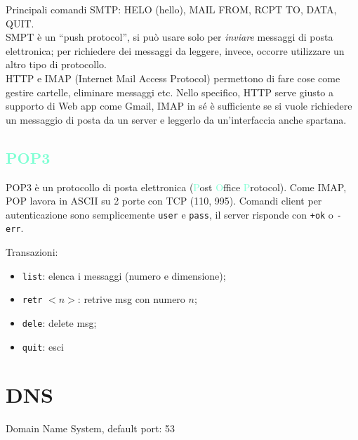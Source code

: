 \noindent Principali comandi SMTP: HELO (hello), MAIL FROM, RCPT TO, DATA, QUIT. \\

\noindent SMPT è un ``push protocol'', si può usare solo per \textit{inviare} messaggi di posta elettronica; per richiedere dei messaggi da leggere, invece, occorre utilizzare un altro tipo di protocollo.\\

\noindent HTTP e IMAP (Internet Mail Access Protocol) permettono di fare cose come gestire cartelle, eliminare messaggi etc. Nello specifico, HTTP serve giusto a supporto di Web app come Gmail, IMAP in sé è sufficiente se si vuole richiedere un messaggio di posta da un server e leggerlo da un'interfaccia anche spartana.

\subsection*{\textcolor{Aquamarine}{POP3}}
\noindent POP3 è un protocollo di posta elettronica (\textcolor{Aquamarine}{P}ost \textcolor{Aquamarine}{O}ffice \textcolor{Aquamarine}{P}rotocol). Come IMAP, POP lavora in ASCII su 2 porte con TCP (110, 995). Comandi client per autenticazione sono semplicemente \texttt{user} e \texttt{pass}, il server risponde con \texttt{+ok} o \texttt{-err}.

\noindent Transazioni:
\begin{itemize}
    \item \texttt{list}: elenca i messaggi (numero e dimensione);
    \item \texttt{retr} $<n>$: retrive msg con numero $n$;
    \item \texttt{dele}: delete msg;
    \item \texttt{quit}: esci
\end{itemize}


\section*{\textcolor{OliveGreen}{DNS}}

\noindent \textcolor{OliveGreen}{D}omain \textcolor{OliveGreen}{N}ame \textcolor{OliveGreen}{S}ystem, default port: 53\\

